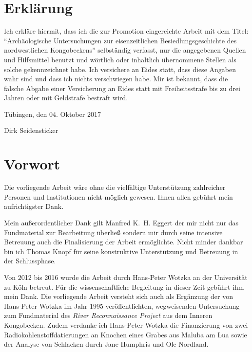 
\chapter*{Erklärung}

Ich erkläre hiermit, dass ich die zur Promotion eingereichte Arbeit mit dem Titel: \enquote{Archäologische Untersuchungen zur eisenzeitlichen Besiedlungsgeschichte des nordwestlichen Kongobeckens} selbständig verfasst, nur die angegebenen Quellen und Hilfsmittel benutzt und wörtlich oder inhaltlich übernommene Stellen als solche gekennzeichnet habe. Ich versichere an Eides statt, dass diese Angaben wahr sind und dass ich nichts verschwiegen habe. Mir ist bekannt, dass die falsche Abgabe einer Versicherung an Eides statt mit Freiheitsstrafe bis zu drei Jahren oder mit Geldstrafe bestraft wird.

\vspace{2.5em}
\noindent Tübingen, den 04. Oktober 2017

\vspace{1em}
\noindent Dirk Seidensticker



\cleardoublepage

\chapter*{Vorwort}

Die vorliegende Arbeit wäre ohne die vielfältige Unterstützung zahlreicher Personen und Institutionen nicht möglich gewesen. Ihnen allen gebührt mein aufrichtigster Dank.

Mein außerordentlicher Dank gilt Manfred K.~H. Eggert der mir nicht nur das Fundmaterial zur Bearbeitung überließ sondern mir durch seine intensive Betreuung auch die Finalisierung der Arbeit ermöglichte. Nicht minder dankbar bin ich Thomas Knopf für seine konstruktive Unterstützung und Betreuung in der Schlussphase. 

Von 2012 bis 2016 wurde die Arbeit durch  Hans-Peter Wotzka an der Universität zu Köln betreut. Für die wissenschaftliche Begleitung in dieser Zeit gebührt ihm mein Dank. Die vorliegende Arbeit versteht sich auch als Ergänzung der von Hans-Peter Wotzka im Jahr 1995 veröffentlichten, wegweisenden Untersuchung zum Fundmaterial des \textit{River Reconnaissance Project} aus dem Inneren Kongobecken. Zudem verdanke ich Hans-Peter Wotzka die Finanzierung von zwei Radiokohlenstoffdatierungen an Knochen eines Grabes aus Maluba am Lua sowie der Analyse von Schlacken durch Jane Humphris und Ole Nordland. 

